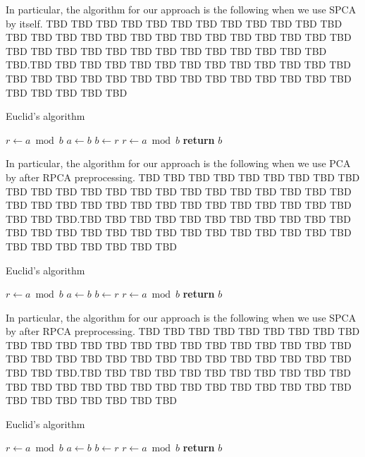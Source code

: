 \documentclass[conference]{IEEEtran}
\begin{document}
In particular, the algorithm for our approach is the following when we use SPCA by itself. TBD TBD TBD TBD TBD TBD TBD TBD TBD TBD TBD TBD TBD TBD TBD TBD TBD TBD TBD TBD TBD TBD TBD TBD TBD TBD TBD TBD TBD TBD TBD TBD TBD TBD TBD TBD TBD TBD TBD TBD.TBD TBD TBD TBD TBD TBD TBD TBD TBD TBD TBD TBD TBD TBD TBD TBD TBD TBD TBD TBD TBD TBD TBD TBD TBD TBD TBD TBD TBD TBD TBD TBD

\begin{algorithm}
\caption{Euclid’s algorithm}\label{alg:euclid}
\begin{algorithmic}[1]
\State $r\gets a\bmod b$
\State $a\gets b$
\State $b\gets r$
\State $r\gets a\bmod b$
\EndWhile\label{euclidendwhile}
\State \textbf{return} $b$
\EndProcedure
\end{algorithmic}
\end{algorithm}

In particular, the algorithm for our approach is the following when we use PCA by after RPCA preprocessing. TBD TBD TBD TBD TBD TBD TBD TBD TBD TBD TBD TBD TBD TBD TBD TBD TBD TBD TBD TBD TBD TBD TBD TBD TBD TBD TBD TBD TBD TBD TBD TBD TBD TBD TBD TBD TBD TBD TBD TBD.TBD TBD TBD TBD TBD TBD TBD TBD TBD TBD TBD TBD TBD TBD TBD TBD TBD TBD TBD TBD TBD TBD TBD TBD TBD TBD TBD TBD TBD TBD TBD TBD

\begin{algorithm}
\caption{Euclid’s algorithm}\label{alg:euclid}
\begin{algorithmic}[1]
\State $r\gets a\bmod b$
\State $a\gets b$
\State $b\gets r$
\State $r\gets a\bmod b$
\EndWhile\label{euclidendwhile}
\State \textbf{return} $b$
\EndProcedure
\end{algorithmic}
\end{algorithm}

In particular, the algorithm for our approach is the following when we use SPCA by after RPCA preprocessing. TBD TBD TBD TBD TBD TBD TBD TBD TBD TBD TBD TBD TBD TBD TBD TBD TBD TBD TBD TBD TBD TBD TBD TBD TBD TBD TBD TBD TBD TBD TBD TBD TBD TBD TBD TBD TBD TBD TBD TBD.TBD TBD TBD TBD TBD TBD TBD TBD TBD TBD TBD TBD TBD TBD TBD TBD TBD TBD TBD TBD TBD TBD TBD TBD TBD TBD TBD TBD TBD TBD TBD TBD

\begin{algorithm}
\caption{Euclid’s algorithm}\label{alg:euclid}
\begin{algorithmic}[1]
\State $r\gets a\bmod b$
\State $a\gets b$
\State $b\gets r$
\State $r\gets a\bmod b$
\EndWhile\label{euclidendwhile}
\State \textbf{return} $b$
\EndProcedure
\end{algorithmic}
\end{algorithm}
\end{document}
